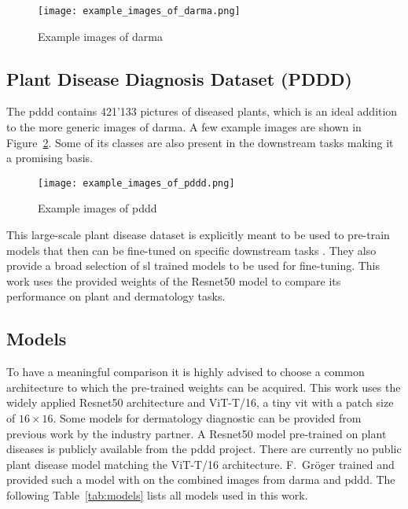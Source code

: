 \begin{figure}[H]
    \begin{center}
    \texttt{[image: example\_images\_of\_darma.png]}
    \caption{Example images of \gls{darma}}\label{fig:example_images_of_darma}
    \end{center}
\end{figure}

\subsection{Plant Disease Diagnosis Dataset (PDDD)}
The \gls{pddd} contains 421'133 pictures of diseased plants, which is an ideal addition to the more generic images of \gls{darma}.
A few example images are shown in Figure~\ref{fig:example_images_of_pddd}. 
Some of its classes are also present in the downstream tasks making it a promising basis.
\begin{figure}[H]
    \begin{center}
    \texttt{[image: example\_images\_of\_pddd.png]}
    \caption{Example images of \gls{pddd}}\label{fig:example_images_of_pddd}
    \end{center}
\end{figure}

This large-scale plant disease dataset is explicitly meant to be used to pre-train models that then can be fine-tuned on specific downstream tasks \autocite{dong2023}. 
They also provide a broad selection of \gls{sl} trained models to be used for fine-tuning. 
This work uses the provided weights of the Resnet50 model to compare its performance on plant and dermatology tasks.

\subsection{Models}
To have a meaningful comparison it is highly advised to choose a common architecture to which the pre-trained weights can be acquired.
This work uses the widely applied Resnet50 architecture and ViT-T/16, a tiny \gls{vit} with a patch size of $16 \times 16$.
Some models for dermatology diagnostic can be provided from previous work by the industry partner.
A Resnet50 model pre-trained on plant diseases is publicly available from the \gls{pddd} project.
There are currently no public plant disease model matching the ViT-T/16 architecture.
F.~Gröger trained and provided such a model with on the combined images from \gls{darma} and \gls{pddd}.
The following Table~\ref{tab:models} lists all models used in this work.

